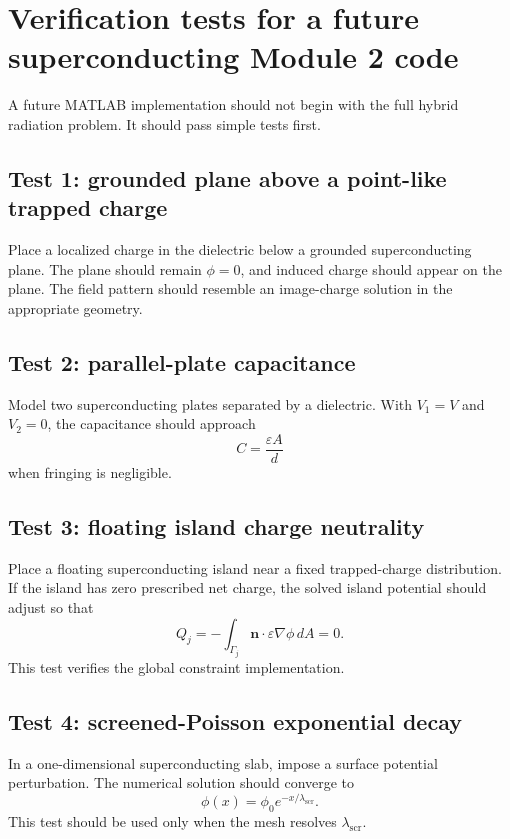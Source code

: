 \documentclass[11pt]{article}
\newcommand{\nvecb}{\mathbf{n}}
\newcommand{\lams}{\lambda_{\mathrm{scr}}}
\begin{document}
\section{Verification tests for a future superconducting Module 2 code}

A future MATLAB implementation should not begin with the full hybrid radiation problem. It should pass simple tests first.

\subsection{Test 1: grounded plane above a point-like trapped charge}

Place a localized charge in the dielectric below a grounded superconducting plane. The plane should remain $\phi=0$, and induced charge should appear on the plane. The field pattern should resemble an image-charge solution in the appropriate geometry.

\subsection{Test 2: parallel-plate capacitance}

Model two superconducting plates separated by a dielectric. With $V_1=V$ and $V_2=0$, the capacitance should approach
\begin{equation}
C=\frac{\varepsilon A}{d}
\end{equation}
when fringing is negligible.

\subsection{Test 3: floating island charge neutrality}

Place a floating superconducting island near a fixed trapped-charge distribution. If the island has zero prescribed net charge, the solved island potential should adjust so that
\begin{equation}
Q_j=-\int_{\Gamma_j}\nvecb\cdot\varepsilon\nabla\phi\,dA=0.
\end{equation}
This test verifies the global constraint implementation.

\subsection{Test 4: screened-Poisson exponential decay}

In a one-dimensional superconducting slab, impose a surface potential perturbation. The numerical solution should converge to
\begin{equation}
\phi(x)=\phi_0 e^{-x/\lams}.
\end{equation}
This test should be used only when the mesh resolves $\lams$.
\end{document}

